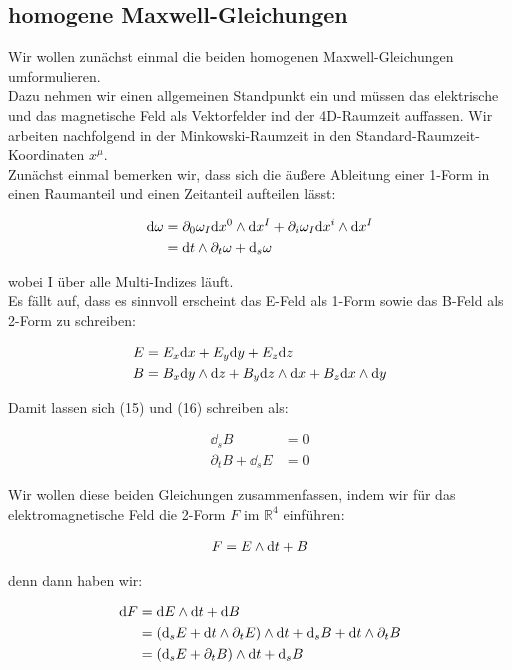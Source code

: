 \subsection{homogene Maxwell-Gleichungen}
Wir wollen zunächst einmal die beiden homogenen Maxwell-Gleichungen umformulieren. \\
Dazu nehmen wir einen allgemeinen Standpunkt ein und müssen das elektrische und das magnetische Feld als Vektorfelder ind der 4D-Raumzeit auffassen. Wir arbeiten nachfolgend in der Minkowski-Raumzeit in den Standard-Raumzeit-Koordinaten $x^{\mu}$. \\
Zunächst einmal bemerken wir, dass sich die äußere Ableitung einer 1-Form in einen Raumanteil und einen Zeitanteil aufteilen lässt:

\begin{align}
\dd \omega &= \partial_0 \omega_I \dd x^0 \wedge \dd x^{I} + \partial_i \omega_I \dd x^i \wedge \dd x^{I} \notag\\
&= \dd t \wedge \partial_t \omega + \dd_s \omega 
\end{align}

wobei I über alle Multi-Indizes läuft. \\
Es fällt auf, dass es sinnvoll erscheint das E-Feld als 1-Form sowie das B-Feld als 2-Form zu schreiben:

\begin{align}
E &= E_x \dd x +E_y \dd y + E_z \dd z   \\
B &= B_x \dd y \wedge \dd z + B_y \dd z \wedge \dd x + B_z \dd x \wedge \dd y 
\end{align}

Damit lassen sich (15) und (16) schreiben als:

\begin{align}
\dd_s B &= 0 \\
\partial_t B + \dd_s E &=0
\end{align}

Wir wollen diese beiden Gleichungen zusammenfassen, indem wir für das elektromagnetische Feld die 2-Form $F$ im $\mathbb{R}^4$ einführen:

\begin{align}  
F= E \wedge \dd t + B 
\end{align} 

denn dann haben wir:

\begin{align}
\dd F &= \dd E \wedge \dd t + \dd B \notag \\
		&= (\dd_s E + \dd t \wedge \partial_t E ) \wedge \dd t + \dd_s B + \dd t \wedge \partial_t B \notag \\
		&= (\dd_s E + \partial_t B) \wedge \dd t + \dd_s B
\end{align}


